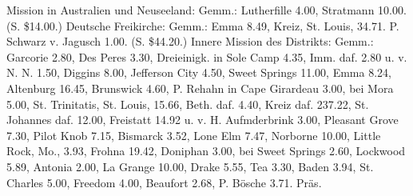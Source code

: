 Mission in Australien und Neuseeland: Gemm.: Lutherfille 4.00, Stratmann 10.00. (S. \$14.00.)
Deutsche Freikirche: Gemm.: Emma 8.49, Kreiz, St. Louis, 34.71. P. Schwarz v. Jagusch 1.00. (S. \$44.20.)
Innere Mission des Distrikts: Gemm.: Garcorie 2.80, Des Peres 3.30, Dreieinigk. in Sole Camp 4.35, Imm. daf. 2.80 u. v. N. N. 1.50, Diggins 8.00, Jefferson City 4.50, Sweet Springs 11.00, Emma 8.24, Altenburg 16.45, Brunswick 4.60, P. Rehahn in Cape Girardeau 3.00, bei Mora 5.00, St. Trinitatis, St. Louis, 15.66, Beth. daf. 4.40, Kreiz daf. 237.22, St. Johannes daf. 12.00, Freistatt 14.92 u. v. H. Aufmderbrink 3.00, Pleasant Grove 7.30, Pilot Knob 7.15, Bismarck 3.52, Lone Elm 7.47, Norborne 10.00, Little Rock, Mo., 3.93, Frohna 19.42, Doniphan 3.00, bei Sweet Springs 2.60, Lockwood 5.89, Antonia 2.00, La Grange 10.00, Drake 5.55, Tea 3.30, Baden 3.94, St. Charles 5.00, Freedom 4.00, Beaufort 2.68, P. Bösche 3.71. Präs.

